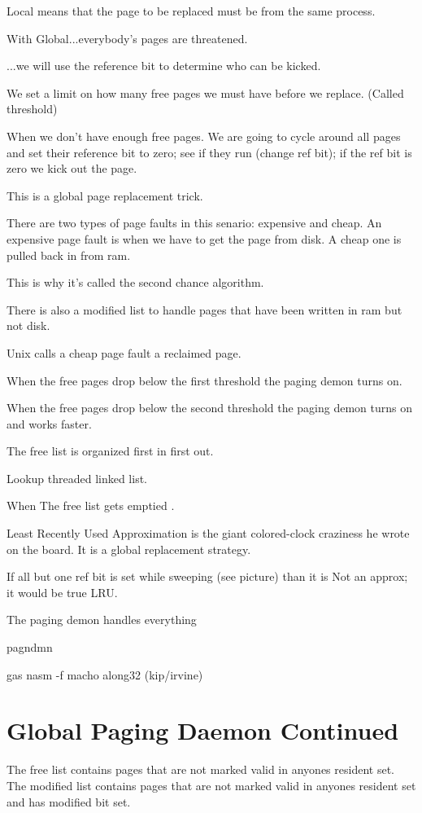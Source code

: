 \documentclass{article}
\begin{document}
Local means that the page to be replaced must be from the same process.

With Global...everybody's pages are threatened.

...we will use the reference bit to determine who can be kicked.

We set a limit on how many free pages we must have before we replace. (Called threshold)

When we don't have enough free pages. 
We are going to cycle around all pages and set their reference bit to zero;
see if they run (change ref bit); if the ref bit is zero we kick out the page.

This is a global page replacement trick.

There are two types of page faults in this senario: expensive and cheap.
An expensive page fault is when we have to get the page from disk.
A cheap one is pulled back in from ram.

This is why it's called the second chance algorithm.

There is also a modified list to handle pages that have been written in ram but not disk.

Unix calls a cheap page fault a reclaimed page.

When the free pages drop below the first threshold the paging demon turns on.

When the free pages drop below the second threshold the paging demon turns on and works faster.

The free list is organized first in first out.

Lookup threaded linked list.

When The free list gets emptied .

Least Recently Used Approximation is the giant colored-clock craziness he wrote on the board.
It is a global replacement strategy.

If all but one ref bit is set while sweeping (see picture) than it is Not an approx;
it would be true LRU.

The paging demon handles everything 

pagndmn

gas
nasm -f macho
along32 (kip/irvine)

\section*{Global Paging Daemon Continued}

The free list contains pages that are not marked valid in anyones resident set.
The modified list contains pages that are not marked valid in anyones resident set and has modified bit set.
\end{document}
